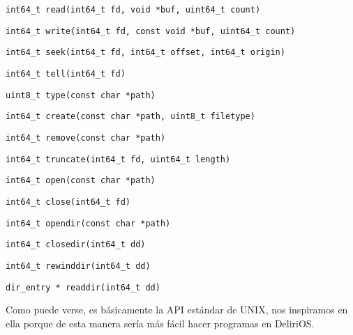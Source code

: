 \begin{lstlisting}[style=customc]
int64_t read(int64_t fd, void *buf, uint64_t count)
\end{lstlisting}
\begin{lstlisting}[style=customc]
int64_t write(int64_t fd, const void *buf, uint64_t count)
\end{lstlisting}
\begin{lstlisting}[style=customc]
int64_t seek(int64_t fd, int64_t offset, int64_t origin)
\end{lstlisting}
\begin{lstlisting}[style=customc]
int64_t tell(int64_t fd)
\end{lstlisting}
\begin{lstlisting}[style=customc]
uint8_t type(const char *path)
\end{lstlisting}
\begin{lstlisting}[style=customc]
int64_t create(const char *path, uint8_t filetype)
\end{lstlisting}
\begin{lstlisting}[style=customc]
int64_t remove(const char *path)
\end{lstlisting}
\begin{lstlisting}[style=customc]
int64_t truncate(int64_t fd, uint64_t length)
\end{lstlisting}
\begin{lstlisting}[style=customc]
int64_t open(const char *path)
\end{lstlisting}
\begin{lstlisting}[style=customc]
int64_t close(int64_t fd)
\end{lstlisting}
\begin{lstlisting}[style=customc]
int64_t opendir(const char *path)
\end{lstlisting}
\begin{lstlisting}[style=customc]
int64_t closedir(int64_t dd)
\end{lstlisting}
\begin{lstlisting}[style=customc]
int64_t rewinddir(int64_t dd)
\end{lstlisting}
\begin{lstlisting}[style=customc]
dir_entry * readdir(int64_t dd)
\end{lstlisting}


Como puede verse, es básicamente la API estándar de UNIX, nos inspiramos en ella porque de esta manera sería más fácil hacer programas en DeliriOS. 

